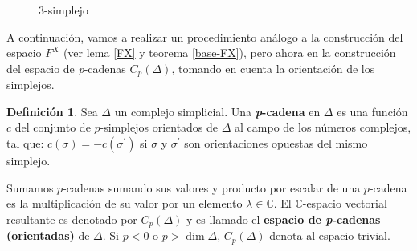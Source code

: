 \documentclass[12pt]{book}
\theoremstyle{definition}
\newtheorem{definition}[theorem]{Definición}
\newcounter{in}
\newcounter{ini}
\begin{document}
\begin{figure}[h]
  \centering
  
  \caption{3-simplejo}
  \label{fig:3-simplejo}
\end{figure}
A continuación, vamos a realizar un procedimiento análogo a la construcción del
espacio $F^{X}$ (ver lema \ref{FX} y teorema \ref{base-FX}), pero ahora en la
construcción del espacio de \emph{p}-cadenas $C_{p}(\Delta)$, tomando
en cuenta la orientación de los simplejos.
\begin{definition}
  Sea $\Delta$ un complejo simplicial. Una \textbf{\emph{p}-cadena} en
  $\Delta$ es una función $c$ del conjunto de $p$-simplejos
  orientados de
  $\Delta$ al campo de los números complejos, tal que:
    $c(\sigma)=-c(\sigma^{'})$ si $\sigma$ y $\sigma^{'}$ son
      orientaciones opuestas del mismo simplejo.
\end{definition}


Sumamos $p$-cadenas sumando sus valores y producto por escalar de una
$p$-cadena es la multiplicación de su valor por un elemento $\lambda\in\mathbb{C}$. El $\mathbb{C}$-espacio vectorial resultante es
denotado por $C_{p}(\Delta)$ y es llamado el \textbf{espacio de
  \emph{p}-cadenas (orientadas)} de $\Delta$. Si $p<0$ o $p>\dim \Delta$,
$C_{p}(\Delta)$ denota al espacio trivial.
\end{document}
